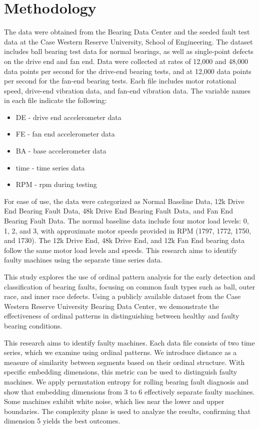 \documentclass[sn-basic,pdflatex]{sn-jnl}
\theoremstyle{remark}
\theoremstyle{definition}
\begin{document}
\section{Methodology}\label{Methodology}

The data were obtained from the Bearing Data Center and the seeded fault
test data at the Case Western Reserve University, School of Engineering.
The dataset includes ball bearing test data for normal bearings, as well
as single-point defects on the drive end and fan end. Data were
collected at rates of 12,000 and 48,000 data points per second for the
drive-end bearing tests, and at 12,000 data points per second for the
fan-end bearing tests. Each file includes motor rotational speed,
drive-end vibration data, and fan-end vibration data. The variable names
in each file indicate the following:

\begin{itemize}
  \item DE - drive end accelerometer data
  \item FE - fan end accelerometer data
  \item BA - base accelerometer data
  \item time - time series data
  \item RPM - rpm during testing 
\end{itemize}

For ease of use, the data were categorized as Normal Baseline Data, 12k
Drive End Bearing Fault Data, 48k Drive End Bearing Fault Data, and Fan
End Bearing Fault Data. The normal baseline data include four motor load
levels: 0, 1, 2, and 3, with approximate motor speeds provided in RPM
(1797, 1772, 1750, and 1730). The 12k Drive End, 48k Drive End, and 12k
Fan End bearing data follow the same motor load levels and speeds. This
research aims to identify faulty machines using the separate time series
data.

This study explores the use of ordinal pattern analysis for the early
detection and classification of bearing faults, focusing on common fault
types such as ball, outer race, and inner race defects. Using a publicly
available dataset from the Case Western Reserve University Bearing Data
Center, we demonstrate the effectiveness of ordinal patterns in
distinguishing between healthy and faulty bearing conditions.

This research aims to identify faulty machines. Each data file consists
of two time series, which we examine using ordinal patterns. We
introduce distance as a measure of similarity between segments based on
their ordinal structure. With specific embedding dimensions, this metric
can be used to distinguish faulty machines. We apply permutation entropy
for rolling bearing fault diagnosis and show that embedding dimensions
from 3 to 6 effectively separate faulty machines. Some machines exhibit
white noise, which lies near the lower and upper boundaries. The
complexity plane is used to analyze the results, confirming that
dimension 5 yields the best outcomes.
\end{document}
